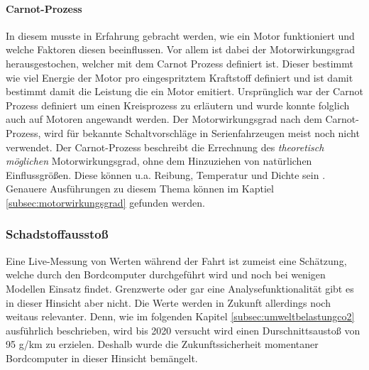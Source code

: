 \paragraph{Carnot-Prozess}
In diesem musste in Erfahrung gebracht werden, wie ein Motor funktioniert und welche Faktoren diesen beeinflussen. Vor allem ist dabei der Motorwirkungsgrad herausgestochen, welcher mit dem Carnot Prozess definiert ist. Dieser bestimmt wie viel Energie der Motor pro eingespritztem Kraftstoff definiert und ist damit bestimmt damit die Leistung die ein Motor emitiert. Ursprünglich war der Carnot Prozess definiert um einen Kreisprozess zu erläutern und wurde konnte folglich auch auf Motoren angewandt werden.
Der Motorwirkungsgrad nach dem Carnot-Prozess, wird für bekannte Schaltvorschläge in Serienfahrzeugen meist noch nicht verwendet. Der Carnot-Prozess beschreibt die Errechnung des \textit{theoretisch möglichen} Motorwirkungsgrad, ohne dem Hinzuziehen von natürlichen Einflussgrößen. Diese können u.a. Reibung, Temperatur und Dichte sein \cite{SIMR.CH1-Fahrstil-Analyse.CarnotWirkungsgrad}. Genauere Ausführungen zu diesem Thema können im Kaptiel \ref{subsec:motorwirkungsgrad} gefunden werden. 

\subsubsection{Schadstoffausstoß}
Eine Live-Messung von  Werten während der Fahrt ist zumeist eine Schätzung, welche durch den Bordcomputer durchgeführt wird und noch bei wenigen Modellen Einsatz findet. Grenzwerte oder gar eine Analysefunktionalität gibt es in dieser Hinsicht aber nicht. Die  Werte werden in Zukunft allerdings noch weitaus relevanter. Denn, wie im folgenden Kapitel \ref{subsec:umweltbelastungco2} ausführlich beschrieben, wird bis 2020 versucht wird einen Durschnittsaustoß von 95 g/km zu erzielen. \cite{SIMR.CH1-Fahrstil_Analyse.EUVerordCO2} Deshalb wurde die Zukunftssicherheit momentaner Bordcomputer in dieser Hinsicht bemängelt.
